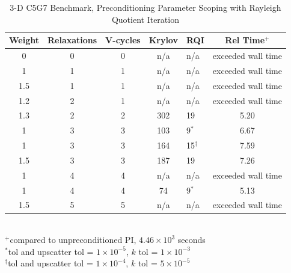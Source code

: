\documentclass[preprint,12pt]{elsarticle}
\begin{document}
\begin{table}[!h]
\caption{3-D C5G7 Benchmark, Preconditioning Parameter Scoping with Rayleigh Quotient Iteration}
\begin{center}
\begin{tabular}{| c | c | c | c | l | c |}
\hline
Weight & Relaxations & V-cycles & Krylov & RQI & Rel Time$^{+}$ \\[0.5ex]
\hline
0    & 0 & 0 & n/a     & n/a          & exceeded wall time \\
1    & 1 & 1 & n/a     & n/a          & exceeded wall time \\
1.5 & 1 & 1 & n/a     & n/a          & exceeded wall time \\
1.2 & 2 & 1 & n/a     & n/a          & exceeded wall time \\
1.3 & 2 & 2 & 302    & 19           & 5.20 \\ %
1    & 3 & 3 & 103    & 9$^{*}$    & 6.67 \\ %
1    & 3 & 3 & 164    & 15$^{\dag}$ & 7.59 \\ %
1.5 & 3 & 3 & 187    & 19           & 7.26 \\ %
1    & 4 & 4 & n/a     & n/a          & exceeded wall time \\
1    & 4 & 4 & 74     & 9$^{*}$    & 5.13 \\ %
1.5 & 5 & 5 & n/a     & n/a          & exceeded wall time \\
\hline 
\end{tabular}\\
$^{+}$compared to unpreconditioned PI, $4.46 \times 10^{3}$ seconds\\
$^{*}$tol and upscatter tol = $1 \times 10^{-5}$, $k$ tol = $1 \times 10^{-3}$\\
$^{\dag}$tol and upscatter tol = $1 \times 10^{-4}$, $k$ tol = $5 \times 10^{-5}$
\end{center}
\label{table:3-D c5g7 rqi}
\end{table}  
\end{document}
